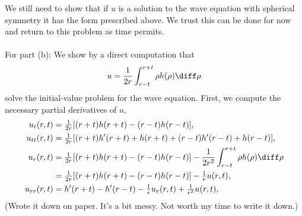 \begin{solution}
  We still need to show that if \(u\) is a solution to the wave equation
  with spherical symmetry it has the form prescribed above. We trust this
  can be done for now and return to this problem as time permits.
  \\\\
  For part (b): We show by a direct computation that
  \[
    u=\frac{1}{2r}\int_{r-t}^{r+t}\rho h(\rho)\diff\rho
  \]
  solve the initial-value problem for the wave equation. First, we compute
  the necessary partial derivatives of \(u\),
  \begin{align*}
    u_t(r,t)
    &=\tfrac{1}{2r}[(r+t)h(r+t)-(r-t)h(r-t)],\\
    u_{tt}(r,t)
    &=\tfrac{1}{2r}[(r+t)h'(r+t)+h(r+t)+(r-t)h'(r-t)+h(r-t)],\\
    u_r(r,t)
    &=\tfrac{1}{2r}[(r+t)h(r+t)-(r-t)h(r-t)]
      -\frac{1}{2r^2}\int_{r-t}^{r+t}\rho h(\rho)\diff\rho\\
    &=\tfrac{1}{2r}[(r+t)h(r+t)-(r-t)h(r-t)]
      -\tfrac{1}{r}u(r,t),\\
    u_{rr}(r,t)&=h'(r+t)-h'(r-t)-\tfrac{1}{r}u_r(r,t)+\tfrac{1}{r^2}u(r,t),
  \end{align*}
  (Wrote it down on paper. It's a bit messy. Not worth my time to write it
  down.)
\end{solution}
\newpage

